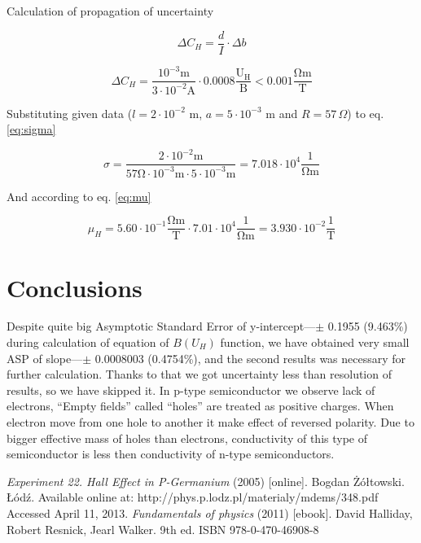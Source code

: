 \documentclass[a4paper,12pt]{article}
\begin{document}
    Calculation of propagation of uncertainty

    \begin{equation}
        \Delta C_H = \frac{d}{I} \cdot \Delta b
    \end{equation}
    
    \begin{displaymath}
        \Delta C_H = \frac{10^{-3}\mathrm{m}}{3 \cdot 10^{-2} \mathrm{A}} \cdot 0.0008 \frac{\mathrm{U_H}}{\mathrm{B}} < 0.001 \frac{\mathrm{\Omega m}}{\mathrm{T}}
    \end{displaymath}

    Substituting given data ($l = 2 \cdot 10^{-2}$ m, $a = 5 \cdot 10^{-3}$ m and $R = 57 \, \Omega$) to eq. \ref{eq:sigma}

    \begin{displaymath}
        \sigma = \frac{2 \cdot 10^{-2} \mathrm{m}}{57 \mathrm{\Omega} \cdot 10^{-3} \mathrm{m} \cdot 5 \cdot 10^{-3} \mathrm{m}} = 7.018 \cdot 10^4 \frac{1}{\mathrm{\Omega m}}
    \end{displaymath}

    And according to eq. \ref{eq:mu}

    \begin{displaymath}
        \mu_H =  5.60 \cdot 10^{-1} \frac{\mathrm{\Omega m}}{\mathrm{T}} \cdot 7.01 \cdot 10^4 \frac{1}{\mathrm{\Omega m}} = 3.930 \cdot 10^{-2} \frac{1}{\mathrm{T}}
    \end{displaymath}
    
    \section{Conclusions}
    Despite quite big Asymptotic Standard Error of y-intercept---$\pm$ 0.1955 (9.463\%) during calculation of equation of $B(U_H)$ function, we have obtained very small ASP of slope---$\pm$ 0.0008003 (0.4754\%), and the second results was necessary for further calculation. Thanks to that we got uncertainty less than resolution of results, so we have skipped it. In p-type semiconductor we observe lack of electrons, ``Empty fields'' called ``holes'' are treated as positive charges. When electron move from one hole to another it make effect of reversed polarity. Due to bigger effective mass of holes than electrons, conductivity of this type of semiconductor is less then conductivity of n-type semiconductors. 



    \begin{thebibliography}{9}
    \emph{Experiment 22. Hall Effect in P-Germanium} (2005) [online]. Bogdan Żółtowski. Łódź. Available online at: http://phys.p.lodz.pl/materialy/mdems/348.pdf Accessed April 11, 2013.
        \emph{Fundamentals of physics} (2011) [ebook]. David Halliday, Robert Resnick, Jearl Walker. 9th ed. ISBN 978-0-470-46908-8
    \end{thebibliography}
\end{document}
